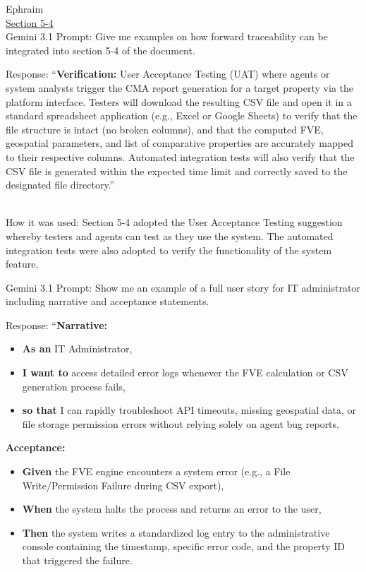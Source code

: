 Ephraim\\
\ul{Section 5-4}\\
Gemini 3.1 Prompt: Give me examples on how forward traceability can be
integrated into section 5-4 of the document.

Response: ``\textbf{Verification:} User Acceptance Testing (UAT) where
agents or system analysts trigger the CMA report generation for a target
property via the platform interface. Testers will download the resulting
CSV file and open it in a standard spreadsheet application (e.g., Excel
or Google Sheets) to verify that the file structure is intact (no broken
columns), and that the computed FVE, geospatial parameters, and list of
comparative properties are accurately mapped to their respective
columns. Automated integration tests will also verify that the CSV file
is generated within the expected time limit and correctly saved to the
designated file directory.''\\
\strut \\
How it was used: Section 5-4 adopted the User Acceptance Testing
suggestion whereby testers and agents can test as they use the system.
The automated integration tests were also adopted to verify the
functionality of the system feature.

Gemini 3.1 Prompt: Show me an example of a full user story for IT
administrator including narrative and acceptance statements.

Response: ``\textbf{Narrative:}

\begin{itemize}
\item
  \textbf{As an} IT Administrator,
\item
  \textbf{I want to} access detailed error logs whenever the FVE
  calculation or CSV generation process fails,
\item
  \textbf{so that} I can rapidly troubleshoot API timeouts, missing
  geospatial data, or file storage permission errors without relying
  solely on agent bug reports.
\end{itemize}

\textbf{Acceptance:}

\begin{itemize}
\item
  \textbf{Given} the FVE engine encounters a system error (e.g., a File
  Write/Permission Failure during CSV export),
\item
  \textbf{When} the system halts the process and returns an error to the
  user,
\item
  \textbf{Then} the system writes a standardized log entry to the
  administrative console containing the timestamp, specific error code,
  and the property ID that triggered the failure.
\end{itemize}

